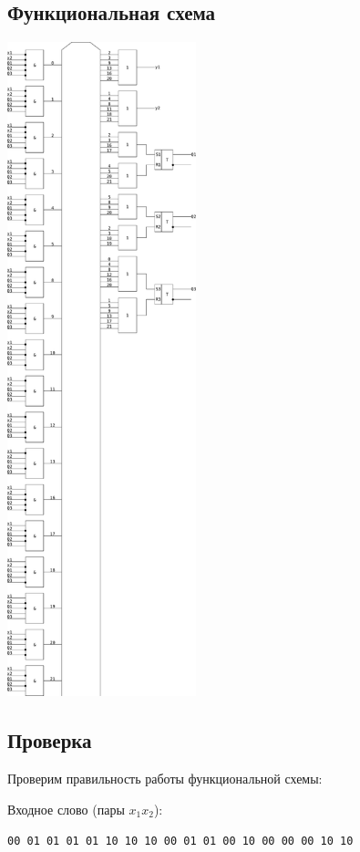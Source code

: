 \documentclass[listings]{labreport}
\begin{document}
\subsection*{Функциональная схема}

\newpage
{}
\thispagestyle{empty}
\includegraphics[width=0.41\textwidth]{srsffcircuit.pdf}
\restoregeometry

\subsection*{Проверка}

Проверим правильность работы функциональной схемы:

Входное слово (пары $x_1x_2$):

\verb|00 01 01 01 01 10 10 10 00 01 01 00 10 00 00 00 10 10|
\end{document}
